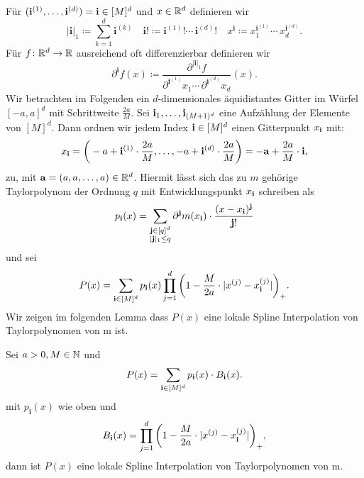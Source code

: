 Für $(\mathbf{i}^{(1)},\dots,\mathbf{i}^{(d)}) = \mathbf{i} \in [M]^d$ und $x \in \mathbb{R}^d$ definieren wir
$$|\mathbf{i}|_1 \coloneqq \sum_{k= 1}^d \mathbf{i}^{(k)} \quad \mathbf{i}! \coloneqq \mathbf{i}^{(1)}! \cdots \, \mathbf{i}^{(d)}! \quad x^{\mathbf{i}} \coloneqq x_1^{\mathbf{i}^{(1)}} \cdots \,    x_d^{\mathbf{i}^{(d)}}.$$
Für $f\colon \mathbb{R}^d \to \mathbb{R}$ ausreichend oft differenzierbar definieren wir 
$$\partial^{\mathbf{i}}f(x) \coloneqq \frac{\partial^{|\mathbf{i}|_1}f}{\partial^{\mathbf{i}^{(1)}} x_1 \cdots \, \partial^{\mathbf{i}^{(d)}} x_d} (x).$$
Wir betrachten im Folgenden ein $d$-dimensionales äquidistantes Gitter im Würfel $[-a, a]^d$ mit Schrittweite $\frac{2a}{M}.$ Sei $\mathbf{i}_1,\dots,\mathbf{i}_{(M + 1)^d}$ eine Aufzählung der Elemente von $[M]^d$. Dann ordnen wir jedem Index $\mathbf{i} \in [M]^d$ einen Gitterpunkt $x_{\mathbf{i}}$ mit:
$$x_{\mathbf{i}} = \bigg( -a + \mathbf{i}^{(1)} \cdot \frac{2a}{M},\dots, -a + \mathbf{i}^{(d)} \cdot \frac{2a}{M}\bigg) = -\mathbf{a} + \frac{2a}{M} \cdot \mathbf{i},$$
zu, mit $\mathbf{a} = (a, a, \dots, a) \in \mathbb{R}^d$.
Hiermit lässt sich das zu $m$ gehörige Taylorpolynom der Ordnung $q$ mit Entwicklungspunkt $x_{\mathbf{i}}$ schreiben als
$$p_{\mathbf{i}}(x) = \sum_{\substack{\mathbf{j} \in [q]^d \\|\mathbf{j}|_1 \leq q}} \partial^{\mathbf{j}}m(x_{\mathbf{i}}) \cdot \frac{(x - x_{\mathbf{i}})^{\mathbf{j}}}{\mathbf{j}!}$$
und sei
\begin{equation}
\label{konvexkomb}
P(x) = \sum_{\mathbf{i} \in [M]^d} p_{\mathbf{i}}(x) \prod_{j = 1}^{d} \bigg(1 - \frac{M}{2a} \cdot |x^{(j)} - x_{\mathbf{i}}^{(j)}|\bigg)_+.
\end{equation}
Wir zeigen im folgenden Lemma dass $P(x)$ eine lokale Spline Interpolation von Taylorpolynomen von m ist.
\begin{lem}
\label{lem:loccon}
Sei $a >0, M \in \mathbb{N}$ und $$P(x) = \sum_{\mathbf{i} \in [M]^d} p_{\mathbf{i}}(x) \cdot B_{\mathbf{i}}(x).$$ mit $p_{\mathbf{i}}(x)$ wie oben und 
$$B_{\mathbf{i}}(x) = \prod_{j = 1}^{d} \bigg(1 - \frac{M}{2a} \cdot |x^{(j)} - x_{\mathbf{i}}^{(j)}|\bigg)_+,$$
dann ist $P(x)$ eine lokale Spline Interpolation von Taylorpolynomen von m.
\end{lem}

